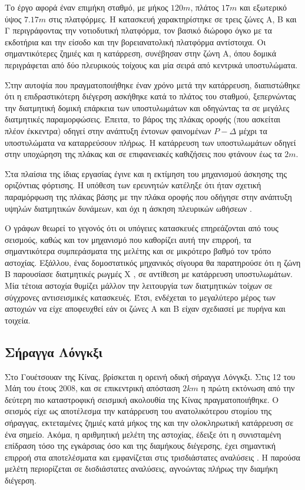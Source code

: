 Το έργο αφορά έναν επιμήκη σταθμό, με μήκος $120m$, πλάτος $17m$ και εξωτερικό ύψος $7.17m$ στις πλατφόρμες. Η κατασκευή χαρακτηρίστηκε σε τρεις ζώνες Α, Β και Γ περιγράφοντας την νοτιοδυτική πλατφόρμα, τον βασικό διώροφο όγκο με τα εκδοτήρια και την είσοδο και την βορειανατολική πλατφόρμα αντίστοιχα. Οι σημαντικότερες ζημιές και η κατάρρεση, συνέβησαν στην ζώνη Α, όπου δομικά περιγράφεται από δύο πλευρικούς τοίχους και μία σειρά από κεντρικά υποστυλώματα.

Στην αυτοψία που πραγματοποιήθηκε έναν χρόνο μετά την κατάρρευση, διαπιστώθηκε ότι η επιδραστικότερη διέγερση ασκήθηκε κατά το πλάτος του σταθμού, ξεπερνώντας την διατμητική δομική επάρκεια των υποστυλωμάτων και οδηγώντας τα σε μεγάλες διατμητικές παραμορφώσεις. Έπειτα, το βάρος της πλάκας οροφής (που ασκείται πλέον έκκεντρα) οδηγεί στην ανάπτυξη έντονων φαινομένων $P-\Delta$ μέχρι τα υποστυλώματα να καταρρεύσουν πλήρως. Η κατάρρευση των υποστυλωμάτων οδηγεί στην υποχώρηση της πλάκας και σε επιφανειακές καθιζήσεις που φτάνουν έως τα $2m$.

Στα πλαίσια της ίδιας εργασίας έγινε και η εκτίμηση του μηχανισμού άσκησης της οριζόντιας φόρτισης. Η υπόθεση των ερευνητών κατέληξε ότι ήταν σχετική παραμόρφωση της πλάκας βάσης με την πλάκα οροφής που οδήγησε στην ανάπτυξη υψηλών διατμητικών δυνάμεων, και όχι η άσκηση πλευρικών ωθήσεων \parencite{Ida}.

Ο γράφων θεωρεί το γεγονός ότι οι υπόγειες κατασκευές επηρεάζονται από τους σεισμούς, καθώς και τον μηχανισμό που καθορίζει αυτή την επιρροή, τα σημαντικότερα συμπεράσματα της μελέτης και σε μικρότερο βαθμό τον τρόπο αστοχίας. Εξάλλου, ένας δομοστατικός μηχανικός σίγουρα θα παρατηρούσε ότι η ζώνη Β παρουσίασε διατμητικές ρωγμές Χ \parencite{Karajohn}, σε αντίθεση με κατάρρευση υποστυλωμάτων. Μία τέτοια αστοχία θυμίζει μάλλον την λειτουργία των διατμητικών τοίχων σε σύγχρονες αντισεισμικές κατασκευές. Έτσι, ενδέχεται το μεγαλύτερο μέρος των αστοχιών να είχε αποφευχθεί εάν οι ζώνες Α και Β είχαν σχεδιασεί με πυρήνα και τοιχεία. 


\subsection{Σήραγγα Λόνγκξι}
Στο Γουέτσουαν της Κίνας, βρίσκεται η ορεινή οδική σήραγγα Λόνγκξι. Στις 12 του Μάη του έτους 2008, και σε επικεντρική απόσταση $2km$ η πρώτη εκτόνωση από την δεύτερη πιο καταστροφική σεισμική ακολουθία της Κίνας πραγματοποιήθηκε. Ο σεισμός είχε ως αποτέλεσμα την κατάρρευση του ανατολικότερου στομίου της σήραγγας, εκτεταμένες ζημιές κατά μήκος της και την ολοκληρωτική κατάρρευση σε ένα σημείο. Ακόμα, η αριθμητική μελέτη της αστοχίας, έδειξε ότι η συνισταμένη επίδραση τόσο της εγκάρσιας όσο και της διαμήκους διέγερσης, έχει σημαντική επιρροή στα αποτελέσματα και εμφανίζεται στις τρισδιάστατες αναλύσεις \parencite{Yu}. Η παρούσα μελέτη περιορίζεται σε δισδιάστατες αναλύσεις, αγνοώντας πλήρως την διαμήκη διέγερση.

